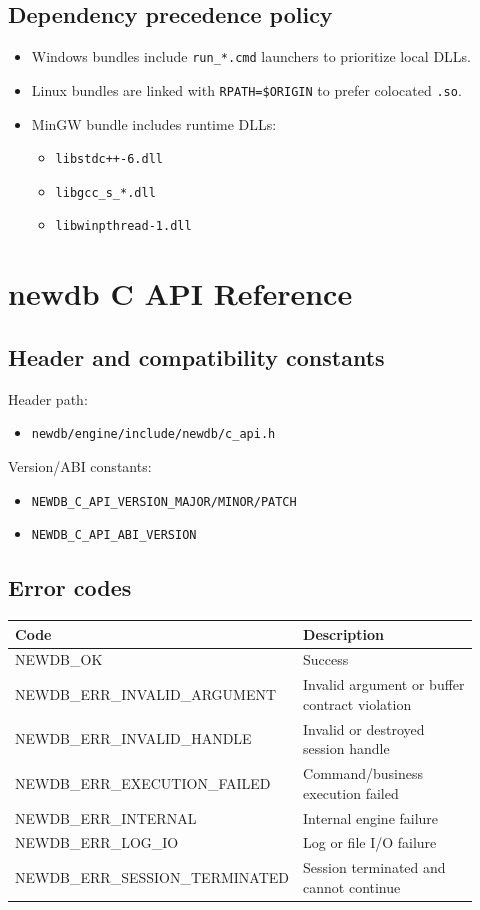\documentclass[11pt,a4paper]{article}
\begin{document}
\subsection{Dependency precedence policy}
\begin{itemize}
  \item Windows bundles include \texttt{run\_*.cmd} launchers to prioritize local DLLs.
  \item Linux bundles are linked with \texttt{RPATH=\$ORIGIN} to prefer colocated \texttt{.so}.
  \item MinGW bundle includes runtime DLLs:
  \begin{itemize}
    \item \texttt{libstdc++-6.dll}
    \item \texttt{libgcc\_s\_*.dll}
    \item \texttt{libwinpthread-1.dll}
  \end{itemize}
\end{itemize}

\section{newdb C API Reference}
\subsection{Header and compatibility constants}
Header path:
\begin{itemize}
  \item \texttt{newdb/engine/include/newdb/c\_api.h}
\end{itemize}

Version/ABI constants:
\begin{itemize}
  \item \texttt{NEWDB\_C\_API\_VERSION\_MAJOR/MINOR/PATCH}
  \item \texttt{NEWDB\_C\_API\_ABI\_VERSION}
\end{itemize}

\subsection{Error codes}
\begin{longtable}{>{\ttfamily}p{0.38\linewidth}p{0.54\linewidth}}
\toprule
Code & Description \\
\midrule
NEWDB\_OK & Success \\
NEWDB\_ERR\_INVALID\_ARGUMENT & Invalid argument or buffer contract violation \\
NEWDB\_ERR\_INVALID\_HANDLE & Invalid or destroyed session handle \\
NEWDB\_ERR\_EXECUTION\_FAILED & Command/business execution failed \\
NEWDB\_ERR\_INTERNAL & Internal engine failure \\
NEWDB\_ERR\_LOG\_IO & Log or file I/O failure \\
NEWDB\_ERR\_SESSION\_TERMINATED & Session terminated and cannot continue \\
\bottomrule
\end{longtable}
\end{document}
